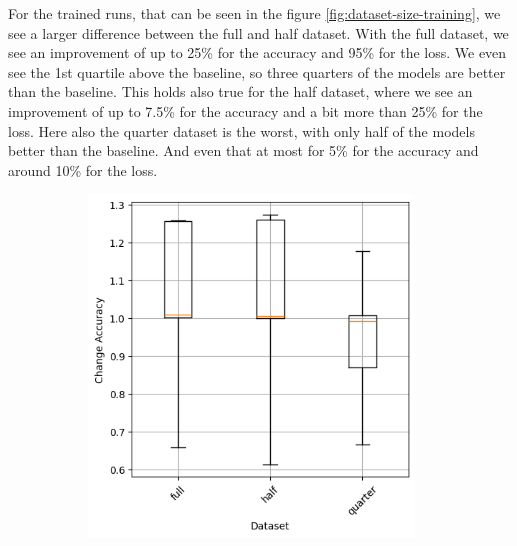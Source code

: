 For the trained runs, that can be seen in the figure \ref{fig:dataset-size-training}, we see a larger difference between the full and half dataset.
With the full dataset, we see an improvement of up to 25\% for the accuracy and 95\% for the loss.
We even see the 1st quartile above the baseline, so three quarters of the models are better than the baseline.
This holds also true for the half dataset, where we see an improvement of up to 7.5\% for the accuracy and a bit more than 25\% for the loss.
Here also the quarter dataset is the worst, with only half of the models better than the baseline.
And even that at most for 5\% for the accuracy and around 10\% for the loss.
\begin{figure}
    \begin{subfigure}{0.5\textwidth}
        \centering
        \includegraphics[width=0.95\textwidth]{plots/Dataset_NotTrained_accuracy.png}
    \end{subfigure}
    \begin{subfigure}{0.5\textwidth}
        \centering

\end{subfigure}
\end{figure}
